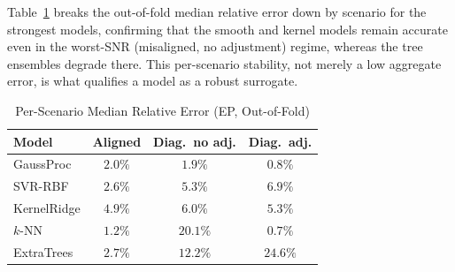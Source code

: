 \documentclass[journal]{IEEEtran}
\begin{document}
Table~\ref{tab:perscen} breaks the out-of-fold median relative error down by scenario
for the strongest models, confirming that the smooth and kernel models remain accurate
even in the worst-SNR (misaligned, no adjustment) regime, whereas the tree ensembles
degrade there. This per-scenario stability, not merely a low aggregate error, is what
qualifies a model as a robust surrogate.

\begin{table}[!tbp]
\centering
\caption{Per-Scenario Median Relative Error (EP, Out-of-Fold)}
\label{tab:perscen}
\setlength{\tabcolsep}{6pt}
\footnotesize
\begin{tabular}{l c c c}
\toprule
Model & Aligned & Diag.\ no adj. & Diag.\ adj.\\
\midrule
GaussProc    & $2.0\%$ & $1.9\%$  & $0.8\%$\\
SVR-RBF      & $2.6\%$ & $5.3\%$  & $6.9\%$\\
KernelRidge  & $4.9\%$ & $6.0\%$  & $5.3\%$\\
$k$-NN       & $1.2\%$ & $20.1\%$ & $0.7\%$\\
ExtraTrees   & $2.7\%$ & $12.2\%$ & $24.6\%$\\
\bottomrule
\end{tabular}
\end{table}
\end{document}
